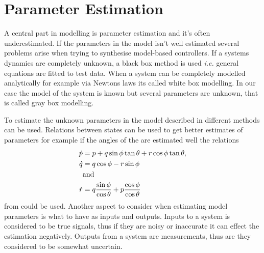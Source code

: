 \chapter{Parameter Estimation} \label{cha:parameterEstimation}
A central part in modelling is parameter estimation and it's often underestimated. If the parameters in the model isn't well estimated several problems arise when trying to synthesise model-based controllers. If a systems dynamics are completely unknown, a black box method is used \textit{i.e.} general equations are fitted to test data. When a system can be completely modelled analytically for example via Newtons laws its called white box modelling. In our case the model of the system is known but several parameters are unknown, that is called gray box modelling. 


To estimate the unknown parameters in the \abbrROV model described in  different methods can be used. Relations between states can be used to get better estimates of parameters for example if the angles of the \abbrROV are estimated well the relations
\begin{align}
\dot{p} &= p + q \sin \phi \tan \theta + r \cos \phi \tan \theta,\\
\dot{q} &= q \cos \phi - r \sin \phi \\
&\textrm{and} \nonumber \\
\dot{r} &= q \frac{\sin \phi}{\cos \theta} + p \frac{\cos \phi}{\cos \theta}
\end{align}
from  could be used. Another aspect to consider when estimating model parameters is what to have as inputs and outputs. Inputs to a system is considered to be true signals, thus if they are noisy or inaccurate it can effect the estimation negatively. Outputs from a system are measurements, thus are they considered to be somewhat uncertain. 

